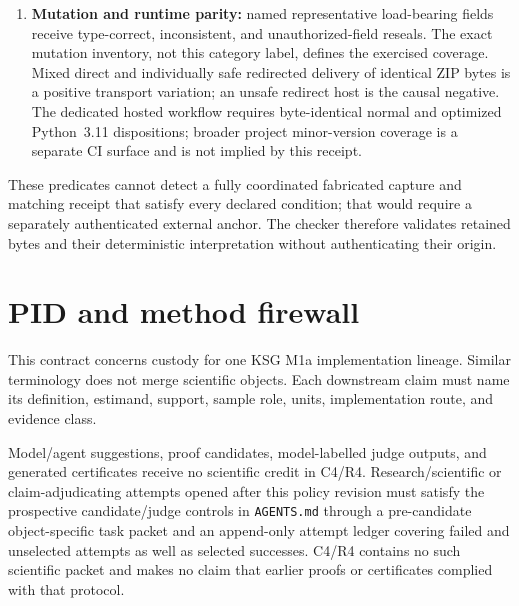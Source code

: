 \documentclass[11pt,a4paper]{article}
\newcommand{\Important}[1]{\textcolor{PidPrimary}{\textbf{#1}}}
\begin{document}
\begin{enumerate}
        from the containing tree, including critical artifacts, PDFs, subprojections, and nonclaims.
  \item \Important{Mutation and runtime parity:} named representative load-bearing fields receive
        type-correct, inconsistent, and unauthorized-field reseals. The exact mutation inventory,
        not this category label, defines the exercised coverage. Mixed direct and individually
        safe redirected delivery of identical ZIP bytes is a positive transport variation; an
        unsafe redirect host is the causal negative. The dedicated hosted workflow requires
        byte-identical normal and optimized Python~3.11 dispositions; broader project minor-version
        coverage is a separate CI surface and is not implied by this receipt.
\end{enumerate}

These predicates cannot detect a fully coordinated fabricated capture and matching receipt that
satisfy every declared condition; that would require a separately authenticated external anchor.
The checker therefore validates retained bytes and their deterministic interpretation without
authenticating their origin.

\section{PID and method firewall}

This contract concerns custody for one KSG M1a implementation lineage. Similar terminology does not
merge scientific objects. Each downstream claim must name its definition, estimand, support,
sample role, units, implementation route, and evidence class.

Model/agent suggestions, proof candidates, model-labelled judge outputs, and generated
certificates receive no scientific credit in C4/R4. Research/scientific or claim-adjudicating
attempts opened after this policy revision must satisfy the prospective candidate/judge controls
in \texttt{AGENTS.md} through a pre-candidate object-specific task packet and an append-only
attempt ledger covering failed and unselected attempts as well as selected successes.
C4/R4 contains no such scientific packet and makes no claim that earlier proofs or certificates
complied with that protocol.
\end{document}
